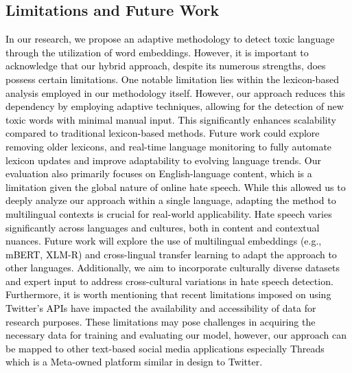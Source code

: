 \subsection{Limitations and Future Work}
\textcolor{black}{In our research, we propose an adaptive methodology to detect toxic language through the utilization of word embeddings. However, it is important to acknowledge that our hybrid approach, despite its numerous strengths, does possess certain limitations.
One notable limitation lies within the lexicon-based analysis employed in our methodology itself. However, our approach reduces this dependency by employing adaptive techniques, allowing for the detection of new toxic words with minimal manual input. This significantly enhances scalability compared to traditional lexicon-based methods. Future work could explore removing older lexicons, and real-time language monitoring to fully automate lexicon updates and improve adaptability to evolving language trends.
Our evaluation also primarily focuses on English-language content, which is a limitation given the global nature of online hate speech. While this allowed us to deeply analyze our approach within a single language, adapting the method to multilingual contexts is crucial for real-world applicability. Hate speech varies significantly across languages and cultures, both in content and contextual nuances. Future work will explore the use of multilingual embeddings (e.g., mBERT, XLM-R) and cross-lingual transfer learning to adapt the approach to other languages. Additionally, we aim to incorporate culturally diverse datasets and expert input to address cross-cultural variations in hate speech detection. Furthermore, it is worth mentioning that recent limitations imposed on using Twitter's APIs have impacted the availability and accessibility of data for research purposes. These limitations may pose challenges in acquiring the necessary data for training and evaluating our model, however, our approach can be mapped to other text-based social media applications especially Threads which is a Meta-owned platform similar in design to Twitter.}




